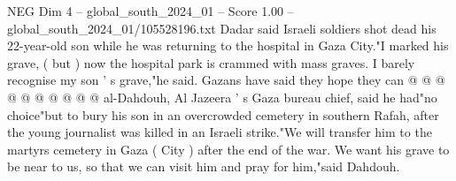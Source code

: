 \begin{textsample}{NEG Dim 4 – global\_south\_2024\_01 – Score 1.00 – global\_south\_2024\_01/105528196.txt}
Dadar said Israeli soldiers shot dead his 22-year-old son while he was returning to the hospital in Gaza City."I marked his grave, ( but ) now the hospital park is crammed with mass graves.
I barely recognise my son ' s grave,"he said.
Gazans have said they hope they can @ @ @ @ @ @ @ @ @ @ al-Dahdouh, Al Jazeera ' s Gaza bureau chief, said he had"no choice"but to bury his son in an overcrowded cemetery in southern Rafah, after the young journalist was killed in an Israeli strike."We will transfer him to the martyrs cemetery in Gaza ( City ) after the end of the war.
We want his grave to be near to us, so that we can visit him and pray for him,"said Dahdouh.

\end{textsample}
